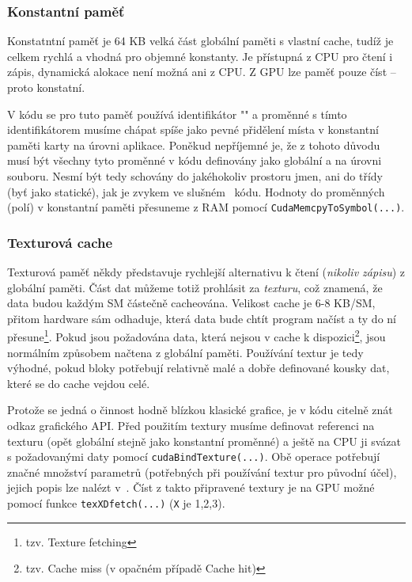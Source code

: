     \subsubsection{Konstantní paměť}

    Konstatntní paměť je 64 KB velká část globální paměti s vlastní cache, tudíž je celkem rychlá a vhodná pro objemné konstanty. Je přístupná z CPU pro čtení i zápis, dynamická alokace není možná ani z CPU. Z GPU lze paměť pouze číst -- proto konstatní.

    V kódu se pro tuto paměť používá identifikátor \Vr"" a proměnné s tímto identifikátorem musíme chápat spíše jako pevné přidělení místa v konstantní paměti karty na úrovni aplikace. Poněkud nepříjemné je, že z tohoto důvodu musí být všechny tyto proměnné v kódu definovány jako globální a na úrovni souboru. Nesmí být tedy schovány do jakéhokoliv prostoru jmen, ani do třídy (byť jako statické), jak je zvykem ve slušném \Cpp ~kódu. Hodnoty do proměnných (polí) v konstantní paměti přesuneme z RAM pomocí {\tt CudaMemcpyToSymbol(...)}.

    \subsubsection{Texturová cache}

    Texturová paměť někdy představuje rychlejší alternativu k čtení (\emph{nikoliv zápisu}) z globální paměti. Část dat můžeme totiž prohlásit za \emph{texturu}, což znamená, že data budou každým SM částečně cacheována. Velikost cache je 6-8 KB/SM, přitom hardware sám odhaduje, která data bude chtít program načíst a ty do ní přesune\footnote{tzv. Texture fetching}. Pokud jsou požadována data, která nejsou v cache k dispozici\footnote{tzv. Cache miss (v opačném případě Cache hit)}, jsou normálním způsobem načtena z globální paměti. Používání textur je tedy výhodné, pokud bloky potřebují relativně malé a dobře definované kousky dat, které se do cache vejdou celé.

    Protože se jedná o činnost hodně blízkou klasické grafice, je v kódu citelně znát odkaz grafického API. Před použitím textury musíme definovat referenci na texturu (opět globální stejně jako konstantní proměnné) a ještě na CPU ji svázat s požadovanými daty pomocí {\tt cudaBindTexture(...)}. Obě operace potřebují značné množství parametrů (potřebných při používání textur pro původní účel), jejich popis lze nalézt v~\cite{CUDA programming g.}. Číst z takto připravené textury je na GPU možné pomocí funkce {\tt texXDfetch(...)} ({\tt X} je 1,2,3).

